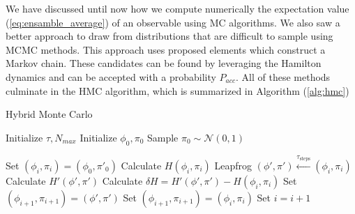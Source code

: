 We have discussed until now how we compute numerically the expectation value (\ref{eq:ensamble_average}) of an observable using MC algorithms. We also saw a better approach to draw from distributions that are difficult to sample using MCMC methods. This approach uses proposed elements which construct a Markov chain. These candidates can be found by leveraging the Hamilton dynamics and can be accepted with a probability $P_{acc}$. All of these methods culminate in the HMC algorithm, which is summarized in Algorithm (\ref{alg:hmc})

\begin{algorithm}
    \caption{Hybrid Monte Carlo}
    \begin{algorithmic}[1]
        \State Initialize  $\tau, N_{max}$
        \State Initialize $\phi_0, \pi_0$
        \State Sample $\pi_0 \sim \mathcal{N}(0,1)$

        \State Set $(\phi_{i}, \pi_{i}) = (\phi_0, \pi'_0)$ 
          
            \State Calculate $H(\phi_{i}, \pi_{i})$
            \State Leapfrog $(\phi', \pi') \xleftarrow{\tau_\text{steps}} (\phi_{i}, \pi_{i})$ 
            \State Calculate $H'(\phi',\pi')$
            \State Calculate $\delta H = H'(\phi',\pi')-H(\phi_{i},\pi_{i})$
             
                \State Set $(\phi_{i+1}, \pi_{i+1}) = (\phi', \pi')$
                \Else
                \State Set $(\phi_{i+1}, \pi_{i+1}) = (\phi_{i}, \pi_{i})$
            \EndIf
        \State Set $i = i + 1$
        \EndWhile
    \end{algorithmic}
    \label{alg:hmc}
    \end{algorithm}
